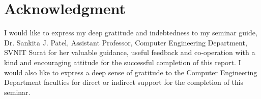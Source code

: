 \documentclass[a4paper, 12pt]{article}
\begin{document}
\newpage
{}
{}
\printbibliography[heading={References}, title=References]
\newpage
{}
\section*{\centering Acknowledgment}
\vskip 0.2in
\raggedright I would like to express my deep gratitude and indebtedness to my seminar guide, Dr. Sankita J. Patel, Assistant Professor, Computer Engineering Department, SVNIT Surat for her valuable guidance, useful feedback and co-operation with a kind and encouraging attitude for the successful completion of this report. I would also like to express a deep sense of gratitude to the Computer Engineering Department faculties for direct or indirect support for the completion of this seminar.
\end{document}

